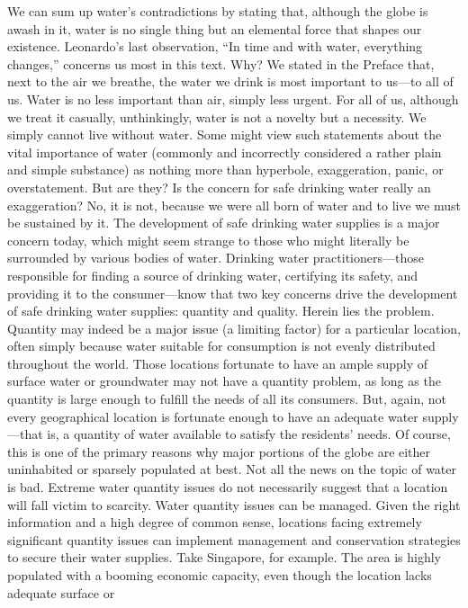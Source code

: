 \documentclass{article}
\begin{document}
We can sum up water's contradictions by stating that, although the globe
is awash in it, water is no single thing but an elemental force that
shapes our existence. Leonardo's last observation, ``In time and with
water, everything changes,'' concerns us most in this text. Why? We
stated in the Preface that, next to the air we breathe, the water we
drink is most important to us---to all of us. Water is no less important
than air, simply less urgent. For all of us, although we treat it
casually, unthinkingly, water is not a novelty but a necessity. We
simply cannot live without water. Some might view such statements about
the vital importance of water (commonly and incorrectly considered a
rather plain and simple substance) as nothing more than hyperbole,
exaggeration, panic, or overstatement. But are they? Is the concern for
safe drinking water really an exaggeration? No, it is not, because we
were all born of water and to live we must be sustained by it. The
development of safe drinking water supplies is a major concern today,
which might seem strange to those who might literally be surrounded by
various bodies of water. Drinking water practitioners---those
responsible for finding a source of drinking water, certifying its
safety, and providing it to the consumer---know that two key concerns
drive the development of safe drinking water supplies: quantity and
quality. Herein lies the problem. Quantity may indeed be a major issue
(a limiting factor) for a particular location, often simply because
water suitable for consumption is not evenly distributed throughout the
world. Those locations fortunate to have an ample supply of surface
water or groundwater may not have a quantity problem, as long as the
quantity is large enough to fulfill the needs of all its consumers. But,
again, not every geographical location is fortunate enough to have an
adequate water supply---that is, a quantity of water available to
satisfy the residents' needs. Of course, this is one of the primary
reasons why major portions of the globe are either uninhabited or
sparsely populated at best. Not all the news on the topic of water is
bad. Extreme water quantity issues do not necessarily suggest that a
location will fall victim to scarcity. Water quantity issues can be
managed. Given the right information and a high degree of common sense,
locations facing extremely significant quantity issues can implement
management and conservation strategies to secure their water supplies.
Take Singapore, for example. The area is highly populated with a booming
economic capacity, even though the location lacks adequate surface or
\end{document}
